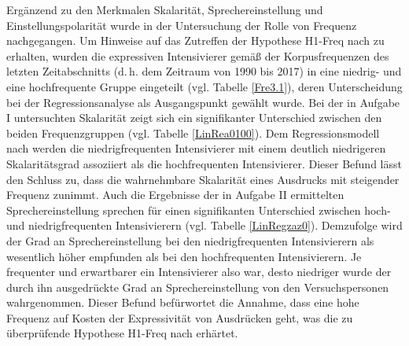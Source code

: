 \largerpage
Ergänzend zu den Merkmalen Skalarität, Sprechereinstellung und Einstellungspolarität wurde in der Untersuchung der Rolle von Frequenz nachgegangen. Um Hinweise auf das Zutreffen der Hypothese H1-Freq nach \citet[2]{Hauschild.1899} zu erhalten, wurden die expressiven Intensivierer gemäß der Korpusfrequenzen des letzten Zeitabschnitts (d.\,h. dem Zeitraum von 1990 bis 2017) in eine niedrig- und eine hochfrequente Gruppe eingeteilt (vgl. Tabelle \ref{Fre3.1}), deren Unterscheidung bei der Regressionsanalyse als Ausgangspunkt gewählt wurde. Bei der in Aufgabe I untersuchten Skalarität zeigt sich ein signifikanter Unterschied zwischen den beiden Frequenzgruppen (vgl. Tabelle \ref{LinRea0100}). Dem Regressionsmodell nach werden die niedrigfrequenten Intensivierer mit einem deutlich niedrigeren Skalaritätsgrad assoziiert als die hochfrequenten Intensivierer. Dieser Befund lässt den Schluss zu, dass die wahrnehmbare Skalarität eines Ausdrucks mit steigender Frequenz zunimmt. Auch die Ergebnisse der in Aufgabe II ermittelten Sprechereinstellung sprechen für einen signifikanten Unterschied zwischen hoch- und niedrigfrequenten Intensivierern (vgl. Tabelle \ref{LinRegzaz0}). Demzufolge wird der Grad an Sprechereinstellung bei den niedrigfrequenten Intensivierern als wesentlich höher empfunden als bei den hochfrequenten Intensivierern. Je frequenter und erwartbarer ein Intensivierer also war, desto niedriger wurde der durch ihn ausgedrückte Grad an Sprechereinstellung von den Versuchspersonen wahrgenommen. Dieser Befund befürwortet die Annahme, dass eine hohe Frequenz auf Kosten der Expressivität von Ausdrücken geht, was die zu überprüfende Hypothese H1-Freq nach \citet[2]{Hauschild.1899} erhärtet.


